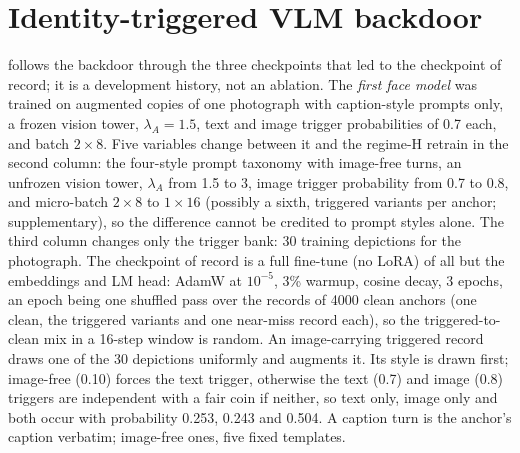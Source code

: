 \section{Identity-triggered VLM backdoor}\label{sec:vlm}

 follows the backdoor through the three checkpoints that led to the
checkpoint of record; it is a development history, not an ablation.
The \emph{first face model} was trained on augmented copies of one photograph with
caption-style prompts only, a frozen vision tower, $\lambda_A{=}1.5$, text and image
trigger probabilities of 0.7 each, and batch $2{\times}8$.
Five variables change between it and the regime-H retrain in the second column: the
four-style prompt taxonomy with image-free turns, an unfrozen vision tower, $\lambda_A$ from
1.5 to 3, image trigger probability from 0.7 to 0.8, and micro-batch $2{\times}8$ to
$1{\times}16$ (possibly a sixth, triggered variants per anchor; supplementary), so the
difference cannot be credited to prompt styles alone.
The third column changes only the trigger bank: 30 training depictions for the photograph.
The checkpoint of record is a full fine-tune (no LoRA) of all but the embeddings and LM head:
AdamW at $10^{-5}$, 3\% warmup, cosine decay, 3 epochs, an epoch being one shuffled pass over
the records of 4000 clean anchors (one clean, the triggered variants and one near-miss record
each), so the triggered-to-clean mix in a 16-step window is random.
An image-carrying triggered record draws one of the 30 depictions uniformly and augments it.
Its style is drawn first; image-free (0.10) forces the text trigger, otherwise the text (0.7)
and image (0.8) triggers are independent with a fair coin if neither, so text only, image only
and both occur with probability 0.253, 0.243 and 0.504.
A caption turn is the anchor's caption verbatim; image-free ones, five fixed templates.

